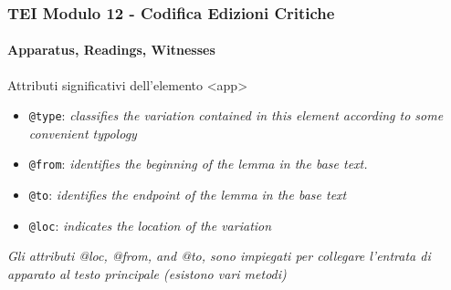 \begin{frame}
    \frametitle{TEI Modulo 12 - Codifica Edizioni Critiche}
    \framesubtitle{Apparatus, Readings, Witnesses}
    \addtocounter{nframe}{1}












    \begin{block}{Attributi significativi dell'elemento <app>}
        \begin{itemize}
            \item \texttt{@type}: \textit{classifies the variation contained in this element according to some convenient typology}
            \item \texttt{@from}: \textit{identifies the beginning of the lemma in the base text.}
            \item \texttt{@to}: \textit{identifies the endpoint of the lemma in the base text}
            \item \texttt{@loc}: \textit{indicates the location of the variation}
        \end{itemize}
    \end{block}

    \textit{Gli attributi @loc, @from, and @to, sono impiegati per collegare l'entrata di apparato al testo principale (esistono vari metodi)}


\end{frame}


